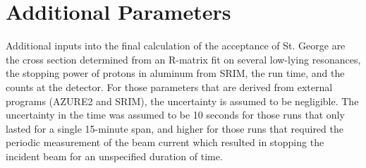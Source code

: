 \section{Additional Parameters}
\label{sec:05-additional-parameters}

Additional inputs into the final calculation of the acceptance of St.
George are the cross section determined from an R-matrix fit on several
low-lying resonances, the stopping power of protons in aluminum from
SRIM, the run time, and the counts at the detector. For those parameters
that are derived from external programs (AZURE2 and SRIM), the
uncertainty is assumed to be negligible. The uncertainty in the time was
assumed to be 10 seconds for those runs that only lasted for a single
15-minute span, and higher for those runs that required the periodic
measurement of the beam current which resulted in stopping the incident
beam for an unspecified duration of time.

